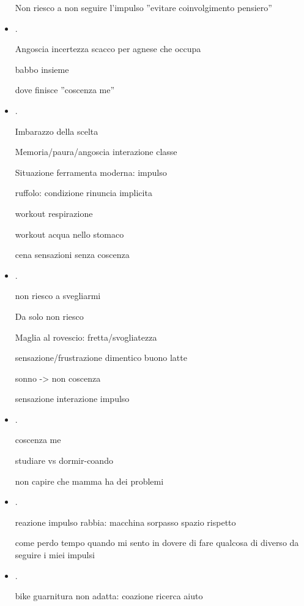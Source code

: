 \begin{itemize}
Non riesco a non seguire l'impulso ''evitare coinvolgimento pensiero''

\item {}.

Angoscia incertezza scacco per agnese che occupa

babbo insieme

dove finisce ''coscenza me''


\item {}.

Imbarazzo della scelta

Memoria/paura/angoscia interazione classe

Situazione ferramenta moderna: impulso

ruffolo: condizione rinuncia implicita

workout respirazione

workout acqua nello stomaco

cena sensazioni senza coscenza

\item {}.

non riesco a svegliarmi

Da solo non riesco

Maglia al rovescio: fretta/svogliatezza

sensazione/frustrazione dimentico buono latte

sonno -> non coscenza

sensazione interazione impulso

\item {}.

coscenza me

studiare vs dormir-coando

non capire che mamma ha dei problemi

\item {}.

reazione impulso rabbia: macchina sorpasso spazio rispetto

come perdo tempo quando mi sento in dovere di fare qualcosa di diverso da seguire i miei impulsi

\item {}.

bike guarnitura non adatta: coazione ricerca aiuto



\end{itemize}
